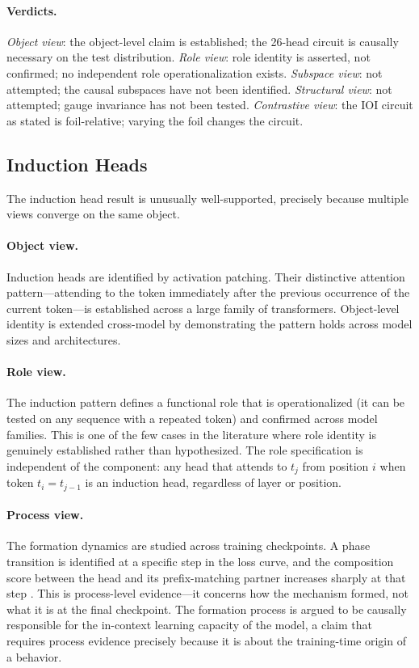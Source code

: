 \documentclass{article}
\begin{document}
\paragraph{Verdicts.}
\emph{Object view}: the object-level claim is established; the 26-head
circuit is causally necessary on the test distribution.
\emph{Role view}: role identity is asserted, not confirmed; no
independent role operationalization exists.
\emph{Subspace view}: not attempted; the causal subspaces have not been
identified.
\emph{Structural view}: not attempted; gauge invariance has not been
tested.
\emph{Contrastive view}: the IOI circuit as stated is foil-relative;
varying the foil changes the circuit.

\subsection{Induction Heads}

The induction head result \citep{olsson2022} is unusually well-supported,
precisely because multiple views converge on the same object.

\paragraph{Object view.}
Induction heads are identified by activation patching.  Their distinctive
attention pattern---attending to the token immediately after the previous
occurrence of the current token---is established across a large family
of transformers.  Object-level identity is extended cross-model by
demonstrating the pattern holds across model sizes and architectures.

\paragraph{Role view.}
The induction pattern defines a functional role that is operationalized
(it can be tested on any sequence with a repeated token) and confirmed
across model families.  This is one of the few cases in the literature
where role identity is genuinely established rather than hypothesized.
The role specification is independent of the component: any head that
attends to $t_{j}$ from position $i$ when token $t_i = t_{j-1}$ is an
induction head, regardless of layer or position.

\paragraph{Process view.}
The formation dynamics are studied across training checkpoints.  A
phase transition is identified at a specific step in the loss curve,
and the composition score between the head and its prefix-matching
partner increases sharply at that step \citep{olsson2022}.  This is
process-level evidence---it concerns how the mechanism formed, not
what it is at the final checkpoint.  The formation process is argued
to be causally responsible for the in-context learning capacity of the
model, a claim that requires process evidence precisely because it is
about the training-time origin of a behavior.
\end{document}
